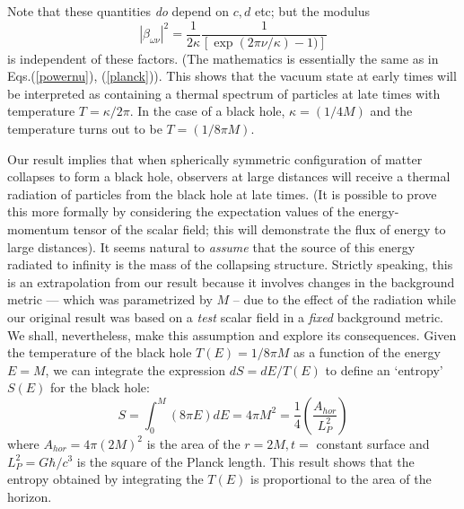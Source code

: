 \documentclass[12pt]{iopart}
\begin{document}
  Note that these quantities {\it do}  depend on $c,d$ etc; but the modulus 
  \begin{equation}
  |\beta_{\omega\nu}|^2=\frac{1}{2\kappa} \frac{1}{\left[\exp(2\pi \nu/\kappa) -1)\right]}
  \end{equation} 
  is independent of these factors. (The mathematics is essentially the same as in Eqs.(\ref{powernu}), (\ref{planck})).
 This shows that the vacuum state at early times will be interpreted as containing 
  a thermal spectrum of particles at late times with temperature $T= \kappa/2\pi$.
  In the case of a black hole, $\kappa = (1/4M)$ and the temperature turns out to be
  $T= (1/8\pi M)$.
 
 

Our result implies that when spherically symmetric configuration of matter collapses to form a black hole, observers at large distances will receive a thermal radiation of particles from the black hole at late times. (It is possible to prove this more formally by considering the expectation values of the energy-momentum tensor of the scalar field; this will demonstrate the flux of energy to large distances). 
It seems natural to \textit{assume} that the source of this energy radiated to infinity is the mass of the collapsing structure. Strictly speaking, this is an extrapolation from our result because it involves changes in the background metric --- which was parametrized by $M$ --  due to the effect of the radiation   while our original result was based on a \textit{test} scalar field in a \textit{fixed} background metric. We shall, nevertheless, make this assumption and explore its consequences. Given the temperature of the black hole $T(E)=1/8\pi M$ as a function of the energy $E=M$, we can integrate the expression $dS=dE/T(E)$ to define an `entropy' $S(E)$ for  the black hole:
\begin{equation}
S=\int_0^M(8\pi E)dE=4\pi M^2=\frac{1}{4}\left(\frac{A_{hor}}{L_P^2}\right)
\label{entbyint}
 \end{equation} 
where $A_{hor}=4\pi(2M)^2$ is the area of the $r=2M,t=$ constant surface and $L_P^2=G\hbar/c^3$ is the square of the Planck length. This result shows that the entropy obtained by integrating the $T(E)$ is proportional to the area of the horizon. 
\end{document}
